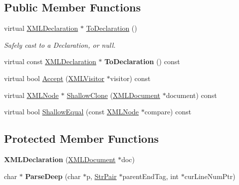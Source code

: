 \subsection*{Public Member Functions}
\begin{DoxyCompactItemize}
\item 
\mbox{\label{classtinyxml2_1_1_x_m_l_declaration_a159d8ac45865215e88059ea1e5b52fc5}} 
virtual \hyperlink{classtinyxml2_1_1_x_m_l_declaration}{X\+M\+L\+Declaration} $\ast$ \hyperlink{classtinyxml2_1_1_x_m_l_declaration_a159d8ac45865215e88059ea1e5b52fc5}{To\+Declaration} ()
\begin{DoxyCompactList}\small\item\em Safely cast to a Declaration, or null. \end{DoxyCompactList}\item 
\mbox{\label{classtinyxml2_1_1_x_m_l_declaration_aa20c3315b18c3b88830dccf5c493259b}} 
virtual const \hyperlink{classtinyxml2_1_1_x_m_l_declaration}{X\+M\+L\+Declaration} $\ast$ {\bfseries To\+Declaration} () const
\item 
virtual bool \hyperlink{classtinyxml2_1_1_x_m_l_declaration_acf47629d9fc08ed6f1c164a97bcf794b}{Accept} (\hyperlink{classtinyxml2_1_1_x_m_l_visitor}{X\+M\+L\+Visitor} $\ast$visitor) const
\item 
virtual \hyperlink{classtinyxml2_1_1_x_m_l_node}{X\+M\+L\+Node} $\ast$ \hyperlink{classtinyxml2_1_1_x_m_l_declaration_ad9d60e6d2df75c13eb6bf7319985b747}{Shallow\+Clone} (\hyperlink{classtinyxml2_1_1_x_m_l_document}{X\+M\+L\+Document} $\ast$document) const
\item 
virtual bool \hyperlink{classtinyxml2_1_1_x_m_l_declaration_ae8b4d3a399857029f36c322b0801b69c}{Shallow\+Equal} (const \hyperlink{classtinyxml2_1_1_x_m_l_node}{X\+M\+L\+Node} $\ast$compare) const
\end{DoxyCompactItemize}
\subsection*{Protected Member Functions}
\begin{DoxyCompactItemize}
\item 
\mbox{\label{classtinyxml2_1_1_x_m_l_declaration_aef9586f2ce5df5feba74dde49a242b06}} 
{\bfseries X\+M\+L\+Declaration} (\hyperlink{classtinyxml2_1_1_x_m_l_document}{X\+M\+L\+Document} $\ast$doc)
\item 
\mbox{\label{classtinyxml2_1_1_x_m_l_declaration_a42a2a36f4d78dc745063b79c16538b9b}} 
char $\ast$ {\bfseries Parse\+Deep} (char $\ast$p, \hyperlink{classtinyxml2_1_1_str_pair}{Str\+Pair} $\ast$parent\+End\+Tag, int $\ast$cur\+Line\+Num\+Ptr)
\end{DoxyCompactItemize}
